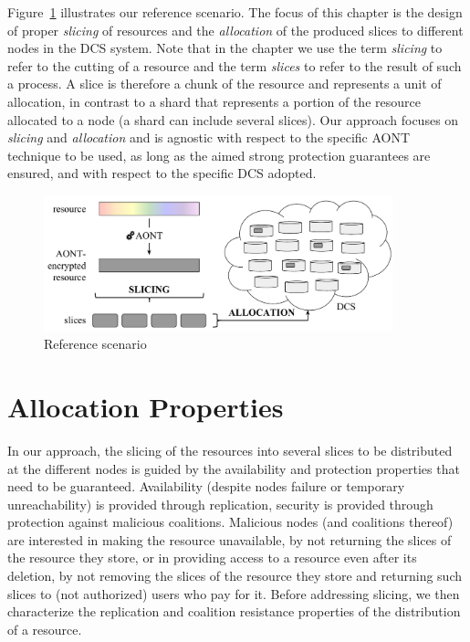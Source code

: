 Figure~\ref{dcs:fig:scenario} illustrates our reference scenario.  The
focus of this chapter is the design of proper {\em slicing\/} of
resources and the {\em allocation\/} of the produced slices to
different nodes in the DCS system.  Note that in the chapter we use the
term {\em slicing\/} to refer to the cutting of a resource and the
term {\em slices\/} to refer to the result of such a process.  A slice
is therefore a chunk of the resource and represents a unit of
allocation, in contrast to a shard that represents a portion of the
resource allocated to a node (a shard can include several slices).
Our approach focuses on {\em slicing\/} and {\em allocation\/} and is
agnostic with respect to the specific AONT technique to be used, as
long as the aimed strong protection guarantees are ensured, and with
respect to the specific DCS adopted.

\begin{figure}
	\begin{center}
		\includegraphics[width=0.9\textwidth]{figures/bdfprs-fig02.pdf}
	\end{center}
	\caption{\label{dcs:fig:scenario}Reference scenario}
\end{figure}




\section{Allocation Properties}\label{dcs:sec:allocation}

In our approach, the slicing of the resources into several slices to
be distributed at the different nodes is guided by the availability
and protection properties that need to be guaranteed.  Availability
(despite nodes failure or temporary unreachability) is provided
through replication, security is provided through protection against
malicious coalitions. Malicious nodes (and coalitions thereof) are
interested in making the resource unavailable, by not returning the
slices of the resource they store, or in providing access to a
resource even after its deletion, by not removing the slices of the
resource they store and returning such slices to (not authorized)
users who pay for it.  Before addressing slicing, we then characterize
the replication and coalition resistance properties of the
distribution of a resource.


